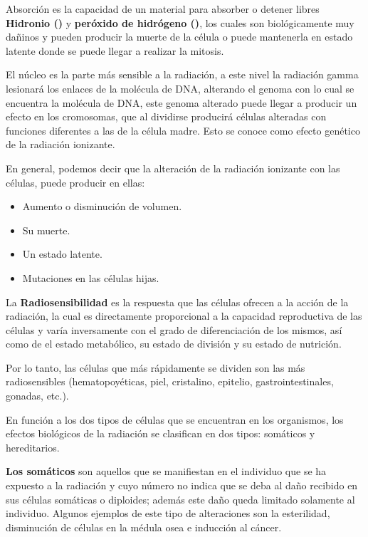 
Absorción es la capacidad de un material para absorber o detener libres \textbf{Hidronio ()} y \textbf{peróxido de hidrógeno ()}, los cuales son biológicamente muy dañinos y pueden producir la muerte de la célula o puede mantenerla en estado latente donde se puede llegar a realizar la mitosis.

El núcleo es la parte más sensible a la radiación, a este nivel la radiación gamma lesionará los enlaces de la molécula de DNA, alterando el genoma con lo cual se encuentra la molécula de DNA, este genoma alterado puede llegar a producir un efecto en los cromosomas, que al dividirse producirá células alteradas con funciones diferentes a las de la célula madre. Esto se conoce como efecto genético de la radiación ionizante.
  
En general, podemos decir que la alteración de la radiación ionizante con las células, puede producir en ellas:

\begin{itemize}
    \item Aumento o disminución de volumen.
    \item Su muerte.
    \item Un estado latente.
    \item Mutaciones en las células hijas.
\end{itemize}

La \textbf{Radiosensibilidad} es la respuesta que las células ofrecen a la acción de la radiación, la cual es directamente proporcional a la capacidad reproductiva de las células y varía inversamente con el grado de diferenciación de los mismos, así como de el estado metabólico, su estado de división y su estado de nutrición.

Por lo tanto, las células que más rápidamente se dividen son las más radiosensibles (hematopoyéticas, piel, cristalino, epitelio, gastrointestinales, gonadas, etc.).

En función a los dos tipos de células que se encuentran en los organismos, los efectos biológicos de la radiación se clasifican en dos tipos: somáticos y hereditarios.

\textbf{Los somáticos} son aquellos que se manifiestan en el individuo que se ha expuesto a la radiación y cuyo número no indica que se deba al daño recibido en sus células somáticas o diploides; además este daño queda limitado solamente al individuo. Algunos ejemplos de este tipo de alteraciones son la esterilidad, disminución de células en la médula osea e inducción al cáncer.


